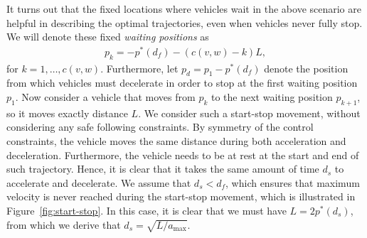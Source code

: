\documentclass[a4paper]{article}
\theoremstyle{definition}
\theoremstyle{plain}
\newtheorem{assump}{Assumption\hspace{0.25em}\ignorespaces}
\begin{document}
{\color{Navy}
It turns out that the fixed locations where vehicles wait in the above scenario
are helpful in describing the optimal trajectories, even when vehicles never
fully stop. We will denote these fixed \textit{waiting positions} as
\begin{align*}
  p_{k} = - p^{*}(d_{f}) - (c(v,w) - k) L,
\end{align*}
for $k = 1, \dots, c(v,w)$.
%
Furthermore, let $p_{d} = p_{1} - p^{*}(d_{f})$ denote the position from
which vehicles must decelerate in order to stop at the first waiting position
$p_{1}$.
%
Now consider a vehicle that moves from $p_{k}$ to the next waiting position
$p_{k+1}$, so it moves exactly distance $L$. We consider such a start-stop
movement, without considering any safe following constraints. By symmetry of the
control constraints, the vehicle moves the same distance during both
acceleration and deceleration. Furthermore, the vehicle needs to be at rest at
the start and end of such trajectory. Hence, it is clear that it takes the same
amount of time $d_{s}$ to accelerate and decelerate. We assume that
$d_{s} < d_{f}$, which ensures that maximum velocity is never reached during the
start-stop movement, which is illustrated in Figure~\ref{fig:start-stop}. In this case, it is
clear that we must have $L = 2 p^{*}(d_{s})$, from which we derive that
$d_{s} = \sqrt{L / a_{\max}}$.
}







\end{document}
